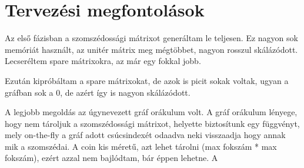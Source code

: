 \section{Tervezési megfontolások}

Az első fázisban a szomszédossági mátrixot generáltam le teljesen. Ez nagyon sok memóriát használt, az unitér mátrix meg mégtöbbet, nagyon rosszul skálázódott. Lecseréltem spare mátrixokra, az már egy fokkal jobb.


Ezután kipróbáltam a spare mátrixokat, de azok is picit sokak voltak, ugyan a gráfban sok a 0, de azért
így is nagyon skálázódott.

A legjobb megoldás az úgynevezett gráf orákulum volt. A gráf orákulum lényege, hogy nem tároljuk a szomszédossági mátrixot, helyette biztosítunk egy függvényt, mely on-the-fly a gráf adott csúcsindexét
odaadva neki visszaadja hogy annak mik a szomszédai. A coin kis méretű, azt lehet tárolni (max fokszám * max fokszám), ezért azzal nem bajlódtam, bár éppen lehetne. A 